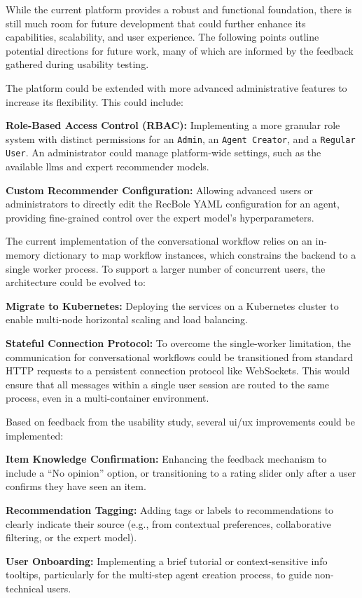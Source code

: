 While the current platform provides a robust and functional foundation, there is still much room for future development that could further enhance its capabilities, scalability, and user experience. The following points outline potential directions for future work, many of which are informed by the feedback gathered during usability testing.

The platform could be extended with more advanced administrative features to increase its flexibility. This could include:
\begin{compactitem}[\textbullet]
    \item \textbf{Role-Based Access Control (RBAC):} Implementing a more granular role system with distinct permissions for an \texttt{Admin}, an \texttt{Agent Creator}, and a \texttt{Regular User}. An administrator could manage platform-wide settings, such as the available \acp{llm} and expert recommender models.
    \item \textbf{Custom Recommender Configuration:} Allowing advanced users or administrators to directly edit the RecBole YAML configuration for an agent, providing fine-grained control over the expert model's hyperparameters.
\end{compactitem}

The current implementation of the conversational workflow relies on an in-memory dictionary to map workflow instances, which constrains the backend to a single worker process. To support a larger number of concurrent users, the architecture could be evolved to:
\begin{compactitem}[\textbullet]
    \item \textbf{Migrate to Kubernetes:} Deploying the services on a Kubernetes cluster to enable multi-node horizontal scaling and load balancing.
    \item \textbf{Stateful Connection Protocol:} To overcome the single-worker limitation, the communication for conversational workflows could be transitioned from standard HTTP requests to a persistent connection protocol like WebSockets. This would ensure that all messages within a single user session are routed to the same process, even in a multi-container environment.
\end{compactitem}

Based on feedback from the usability study, several \acs{ui}/\acs{ux} improvements could be implemented:
\begin{compactitem}[\textbullet]
    \item \textbf{Item Knowledge Confirmation:} Enhancing the feedback mechanism to include a ``No opinion'' option, or transitioning to a rating slider only after a user confirms they have seen an item.
    \item \textbf{Recommendation Tagging:} Adding tags or labels to recommendations to clearly indicate their source (e.g., from contextual preferences, collaborative filtering, or the expert model).
    \item \textbf{User Onboarding:} Implementing a brief tutorial or context-sensitive info tooltips, particularly for the multi-step agent creation process, to guide non-technical users.
\end{compactitem}

